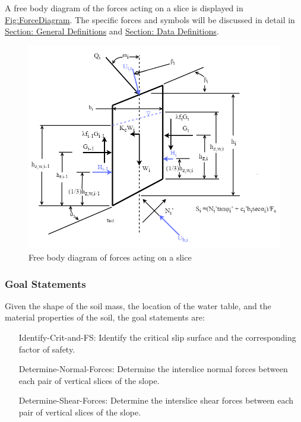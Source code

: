 \documentclass[12pt]{article}
\begin{document}
A free body diagram of the forces acting on a slice is displayed in \hyperref[Figure:ForceDiagram]{Fig:ForceDiagram}. The specific forces and symbols will be discussed in detail in \hyperref[Sec:GDs]{Section: General Definitions} and \hyperref[Sec:DDs]{Section: Data Definitions}.
\begin{figure}
\begin{center}
\includegraphics[width=\textwidth]{../../../datafiles/SSP/ForceDiagram.png}
\caption{Free body diagram of forces acting on a slice}
\label{Figure:ForceDiagram}
\end{center}
\end{figure}
\subsubsection{Goal Statements}
\label{Sec:GoalStmt}
Given the shape of the soil mass, the location of the water table, and the material properties of the soil, the goal statements are:
\begin{itemize}
\item[Identify-Crit-and-FS:\phantomsection\label{identifyCritAndFS}]Identify the critical slip surface and the corresponding factor of safety.
\item[Determine-Normal-Forces:\phantomsection\label{determineNormalF}]Determine the interslice normal forces between each pair of vertical slices of the slope.
\item[Determine-Shear-Forces:\phantomsection\label{determineShearF}]Determine the interslice shear forces between each pair of vertical slices of the slope.
\end{itemize}
\end{document}
